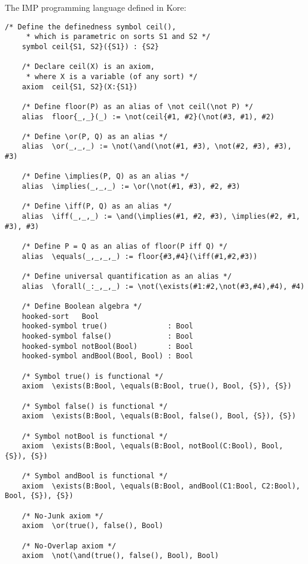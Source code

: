 \documentclass[UTF8,11pt]{article}
\theoremstyle{plain}
\theoremstyle{definition}
\theoremstyle{remark}
\begin{document}
The IMP programming language defined in Kore:

\begin{Verbatim}[fontsize=\small]
    /* Define the definedness symbol ceil(),
     * which is parametric on sorts S1 and S2 */
    symbol ceil{S1, S2}({S1}) : {S2}
    
    /* Declare ceil(X) is an axiom, 
     * where X is a variable (of any sort) */
    axiom  ceil{S1, S2}(X:{S1})
    
    /* Define floor(P) as an alias of \not ceil(\not P) */
    alias  floor{_,_}(_) := \not(ceil{#1, #2}(\not(#3, #1), #2)
    
    /* Define \or(P, Q) as an alias */
    alias  \or(_,_,_) := \not(\and(\not(#1, #3), \not(#2, #3), #3), #3)
    
    /* Define \implies(P, Q) as an alias */
    alias  \implies(_,_,_) := \or(\not(#1, #3), #2, #3)
    
    /* Define \iff(P, Q) as an alias */
    alias  \iff(_,_,_) := \and(\implies(#1, #2, #3), \implies(#2, #1, #3), #3)
    
    /* Define P = Q as an alias of floor(P iff Q) */
    alias  \equals(_,_,_,_) := floor{#3,#4}(\iff(#1,#2,#3))
    
    /* Define universal quantification as an alias */
    alias  \forall(_:_,_,_) := \not(\exists(#1:#2,\not(#3,#4),#4), #4)
    
    /* Define Boolean algebra */
    hooked-sort   Bool
    hooked-symbol true()              : Bool
    hooked-symbol false()             : Bool
    hooked-symbol notBool(Bool)       : Bool
    hooked-symbol andBool(Bool, Bool) : Bool
    
    /* Symbol true() is functional */
    axiom  \exists(B:Bool, \equals(B:Bool, true(), Bool, {S}), {S})
    
    /* Symbol false() is functional */
    axiom  \exists(B:Bool, \equals(B:Bool, false(), Bool, {S}), {S})
    
    /* Symbol notBool is functional */
    axiom  \exists(B:Bool, \equals(B:Bool, notBool(C:Bool), Bool, {S}), {S})
    
    /* Symbol andBool is functional */
    axiom  \exists(B:Bool, \equals(B:Bool, andBool(C1:Bool, C2:Bool), Bool, {S}), {S})
    
    /* No-Junk axiom */
    axiom  \or(true(), false(), Bool)
    
    /* No-Overlap axiom */
    axiom  \not(\and(true(), false(), Bool), Bool)
    

\end{Verbatim}
\end{document}
